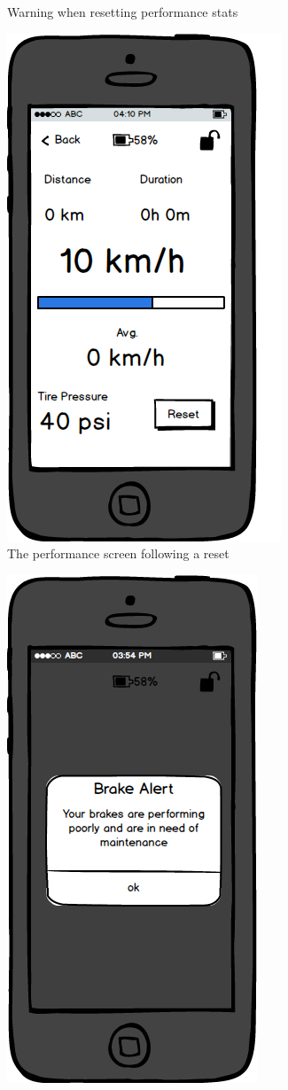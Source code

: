 \documentclass[a4paper]{report}
\begin{document}
{\begin{figure}
\caption{Warning when resetting performance stats}
\end{figure}
\clearpage
\begin{figure}
\centering
\includegraphics[scale=0.9]{figures/prototype_1/resetted}
\caption{The performance screen following a reset}
\end{figure}
\clearpage
\begin{figure}
\centering
\includegraphics[scale=0.9]{figures/prototype_1/brake_maint}

\end{figure}}
\end{document}
